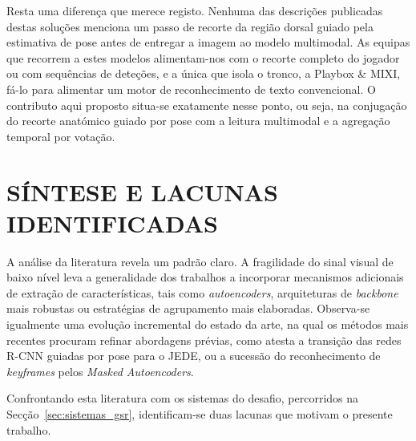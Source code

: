 Resta uma diferença que merece registo. Nenhuma das descrições publicadas destas soluções
menciona um passo de recorte da região dorsal guiado pela estimativa de pose antes de
entregar a imagem ao modelo multimodal. As equipas que recorrem a estes modelos alimentam-nos
com o recorte completo do jogador ou com sequências de deteções, e a única que isola o tronco,
a Playbox \& MIXI, fá-lo para alimentar um motor de reconhecimento de texto convencional. O
contributo aqui proposto situa-se exatamente nesse ponto, ou seja, na conjugação do recorte
anatómico guiado por pose com a leitura multimodal e a agregação temporal por votação.



\section{SÍNTESE E LACUNAS IDENTIFICADAS}
\label{sec:sintese_lacunas}

A análise da literatura revela um padrão claro. A fragilidade do sinal visual de baixo nível
leva a generalidade dos trabalhos a incorporar mecanismos adicionais de extração de
características, tais como \emph{autoencoders}, arquiteturas de \emph{backbone} mais robustas
ou estratégias de agrupamento mais elaboradas. Observa-se igualmente uma evolução incremental
do estado da arte, na qual os métodos mais recentes procuram refinar abordagens prévias, como
atesta a transição das redes R-CNN guiadas por pose para o JEDE, ou a sucessão do
reconhecimento de \emph{keyframes} pelos \emph{Masked Autoencoders}.

Confrontando esta literatura com os sistemas do desafio, percorridos na
Secção~\ref{sec:sistemas_gsr}, identificam-se duas lacunas que motivam o presente trabalho.

